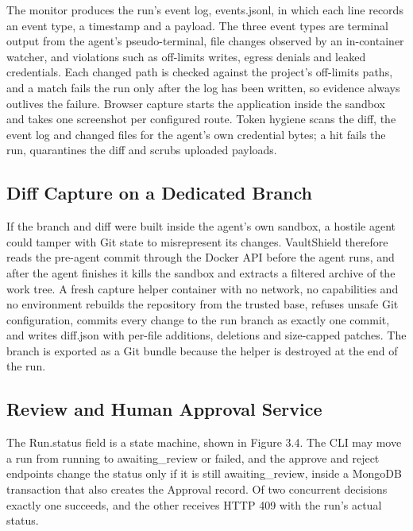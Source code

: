 \documentclass[12pt,a4paper,oneside]{report}
\begin{document}
The monitor produces the run's event log, events.jsonl, in which each line records an event type, a timestamp and a payload. The three event types are terminal output from the agent's pseudo-terminal, file changes observed by an in-container watcher, and violations such as off-limits writes, egress denials and leaked credentials. Each changed path is checked against the project's off-limits paths, and a match fails the run only after the log has been written, so evidence always outlives the failure. Browser capture starts the application inside the sandbox and takes one screenshot per configured route. Token hygiene scans the diff, the event log and changed files for the agent's own credential bytes; a hit fails the run, quarantines the diff and scrubs uploaded payloads.

\subsection{Diff Capture on a Dedicated Branch}\label{diff-capture-on-a-dedicated-branch}

If the branch and diff were built inside the agent's own sandbox, a hostile agent could tamper with Git state to misrepresent its changes. VaultShield therefore reads the pre-agent commit through the Docker API before the agent runs, and after the agent finishes it kills the sandbox and extracts a filtered archive of the work tree. A fresh capture helper container with no network, no capabilities and no environment rebuilds the repository from the trusted base, refuses unsafe Git configuration, commits every change to the run branch as exactly one commit, and writes diff.json with per-file additions, deletions and size-capped patches. The branch is exported as a Git bundle because the helper is destroyed at the end of the run.

\subsection{Review and Human Approval Service}\label{review-and-human-approval-service}

The Run.status field is a state machine, shown in Figure 3.4. The CLI may move a run from running to awaiting\_\allowbreak{}review or failed, and the approve and reject endpoints change the status only if it is still awaiting\_\allowbreak{}review, inside a MongoDB transaction that also creates the Approval record. Of two concurrent decisions exactly one succeeds, and the other receives HTTP 409 with the run's actual status.
\end{document}
